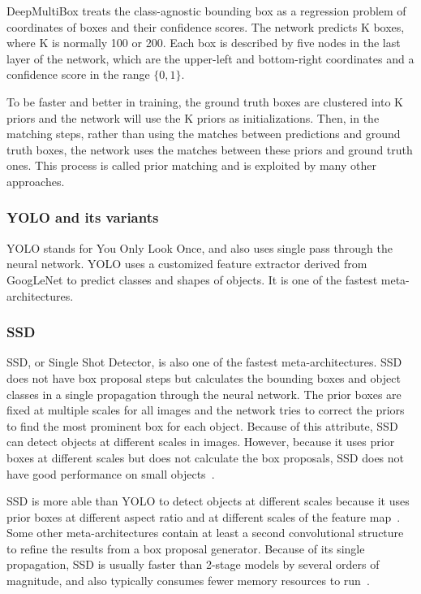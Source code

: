 \documentclass[conference]{IEEEtran}
\begin{document}
DeepMultiBox treats the class-agnostic bounding box as a regression problem of coordinates of boxes and their confidence scores. The network predicts K boxes, where K is normally 100 or 200. Each box is described by five nodes in the last layer of the network, which are the upper-left and bottom-right coordinates and a confidence score in the range $\{0, 1\}$.

To be faster and better in training, the ground truth boxes are clustered into K priors and the network will use the K priors as initializations. Then, in the matching steps, rather than using the matches between predictions and ground truth boxes, the network uses the matches between these priors and ground truth ones. This process is called prior matching and is exploited by many other approaches.

\subsubsection{YOLO and its variants}
YOLO stands for You Only Look Once, and also uses single pass through the neural network.  YOLO uses a customized feature extractor derived from GoogLeNet to predict classes and shapes of objects.  It is one of the fastest meta-architectures.

\subsubsection{SSD}
SSD, or Single Shot Detector, is also one of the fastest meta-architectures.
SSD does not have box proposal steps but calculates the bounding boxes and object classes in a single propagation through the neural network.
The prior boxes are fixed at multiple scales for all images and the network tries to correct the priors to find the most prominent box for each object.
Because of this attribute, SSD can detect objects at different scales in images.
However, because it uses prior boxes at different scales but does not calculate the box proposals, SSD does not have good performance on small objects~\cite{liu2016ssd}.

SSD is more able than YOLO to detect objects at different scales because it uses prior boxes at different aspect ratio and at different scales of the feature map~\cite{liu2016ssd}. 
Some other meta-architectures contain at least a second convolutional structure to refine the results from a box proposal generator. 
Because of its single propagation, SSD is usually faster than 2-stage models by several orders of magnitude, and also typically consumes fewer memory resources to run~\cite{huang2017speed}.
\end{document}
